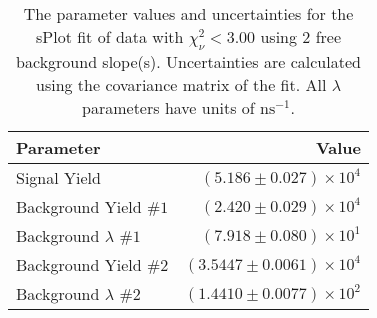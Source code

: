 
\begin{table}
    \begin{center}
        \begin{tabular}{lr}\toprule
            Parameter & Value \\\midrule
            Signal Yield & $(5.186 \pm 0.027) \times 10^{4}$ \\
            Background Yield $\#1$ & $(2.420 \pm 0.029) \times 10^{4}$ \\
            Background $\lambda$ $\#1$ & $(7.918 \pm 0.080) \times 10^{1}$ \\
            Background Yield $\#2$ & $(3.5447 \pm 0.0061) \times 10^{4}$ \\
            Background $\lambda$ $\#2$ & $(1.4410 \pm 0.0077) \times 10^{2}$ \\\bottomrule
        \end{tabular}
        \caption{The parameter values and uncertainties for the sPlot fit of data with $\chi^2_\nu < 3.00$ using 2 free background slope(s). Uncertainties are calculated using the covariance matrix of the fit. All $\lambda$ parameters have units of $\si{\nano\second}^{-1}$.}
    \end{center}
\end{table}

